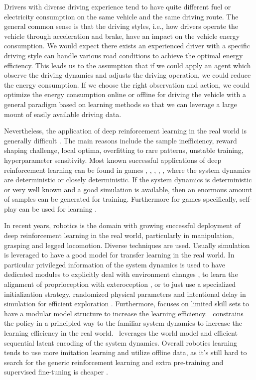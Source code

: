 \documentclass{article}
\begin{document}
Drivers with diverse driving experience tend to have quite different fuel or electricity consumption on the same vehicle and the same driving route. The general common sense is that the driving styles, i.e., how drivers operate the vehicle through acceleration and brake, have an impact on the vehicle energy consumption. We would expect there exists an experienced driver with a specific driving style can handle various road conditions to achieve the optimal energy efficiency. This leads us to the assumption that if we could apply an agent which observe the driving dynamics and adjusts the driving operation, we could reduce the energy consumption. If we choose the right observation and action, we could optimize the energy consumption online or offline for driving the vehicle with a general paradigm based on learning methods so that we can leverage a large mount of easily available driving data.

Nevertheless, the application of deep reinforcement learning in the real world is generally difficult \parencite{Irpan_2018}. The main reasons include the sample inefficiency, reward shaping challenge, local optima, overfitting to rare patterns, unstable training, hyperparameter sensitivity. Most known successful applications of deep reinforcement learning can be found in games \parencite{mnih13:_playin_atari_deep_reinf_learn}, \parencite{DBLP:journals/nature/SilverHMGSDSAPL16}, \parencite{DBLP:conf/ijcai/BrownS17}, \parencite{openai19:_dota_large_scale_deep_reinf_learn}, \parencite{bakhtin22:_Human_level_diplomacy_cicero}, where the system dynamics are deterministic or closely deterministic.
If the system dynamics is deterministic or very well known and a good simulation is available, then an enormous amount of samples can be generated for training. Furthermore for games specifically, self-play can be used for learning \parencite{Silver_2018}.

In recent years, robotics is the domain with growing successful deployment of deep reinforcement learning in the real world, particularly in manipulation, grasping and legged locomotion. Diverse techniques are used. Usually simulation is leveraged to have a good model for transfer learning in the real world. In particular privileged information of the system dynamics is used to have dedicated modules to explicitly deal with environment changes \parencite{kumar21:_rma}, to learn the alignment of proprioception with exteroception \parencite{Miki_2022}, or to just use a specialized initialization strategy, randomized physical parameters and intentional delay in simulation for efficient exploration \parencite{Song_2023}. Furthermore, \parencite{Hoeller_2024} focuses on limited skill sets to have a modular model structure to increase the learning efficiency.\ \parencite{smith23:_grow_your_limit} constrains the policy in a principled way to the familiar system dynamics to increase the learning efficiency in the real world.\ \parencite{wu22:_daydr} leverages the world model and efficient sequential latent encoding of the system dynamics. Overall robotics learning tends to use more imitation learning and utilize offline data, as it's still hard to search for the generic reinforcement learning and extra pre-training and supervised fine-tuning is cheaper \parencite{Irpan_2024}.
\end{document}
